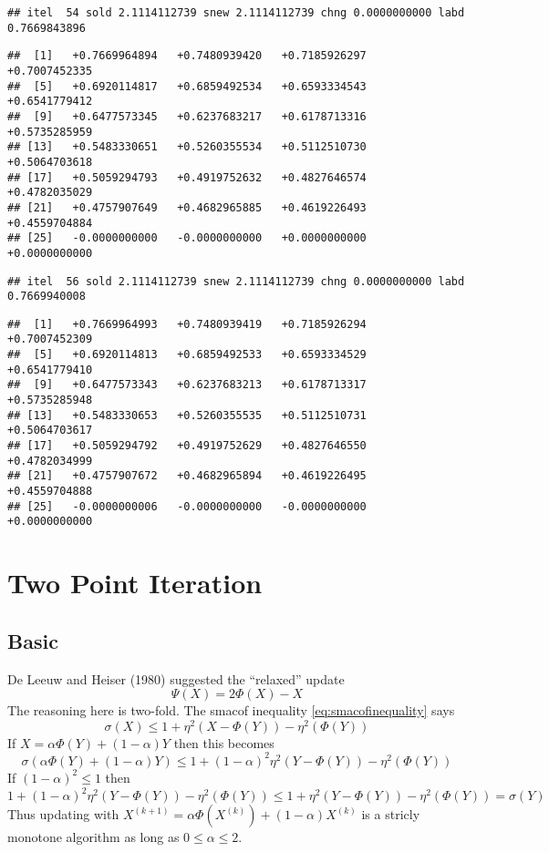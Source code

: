 \documentclass[
  12pt,
]{article}
\begin{document}
\begin{verbatim}
## itel  54 sold 2.1114112739 snew 2.1114112739 chng 0.0000000000 labd 0.7669843896
\end{verbatim}

\begin{verbatim}
##  [1]   +0.7669964894   +0.7480939420   +0.7185926297   +0.7007452335
##  [5]   +0.6920114817   +0.6859492534   +0.6593334543   +0.6541779412
##  [9]   +0.6477573345   +0.6237683217   +0.6178713316   +0.5735285959
## [13]   +0.5483330651   +0.5260355534   +0.5112510730   +0.5064703618
## [17]   +0.5059294793   +0.4919752632   +0.4827646574   +0.4782035029
## [21]   +0.4757907649   +0.4682965885   +0.4619226493   +0.4559704884
## [25]   -0.0000000000   -0.0000000000   +0.0000000000   +0.0000000000
\end{verbatim}

\begin{verbatim}
## itel  56 sold 2.1114112739 snew 2.1114112739 chng 0.0000000000 labd 0.7669940008
\end{verbatim}

\begin{verbatim}
##  [1]   +0.7669964993   +0.7480939419   +0.7185926294   +0.7007452309
##  [5]   +0.6920114813   +0.6859492533   +0.6593334529   +0.6541779410
##  [9]   +0.6477573343   +0.6237683213   +0.6178713317   +0.5735285948
## [13]   +0.5483330653   +0.5260355535   +0.5112510731   +0.5064703617
## [17]   +0.5059294792   +0.4919752629   +0.4827646550   +0.4782034999
## [21]   +0.4757907672   +0.4682965894   +0.4619226495   +0.4559704888
## [25]   -0.0000000006   -0.0000000000   -0.0000000000   +0.0000000000
\end{verbatim}

\section{Two Point Iteration}\label{two-point-iteration}

\subsection{Basic}\label{basic}

De Leeuw and Heiser (1980) suggested the ``relaxed'' update
\[
\Psi(X)=2\Phi(X)-X
\]
The reasoning here is two-fold. The smacof inequality \eqref{eq:smacofinequality} says
\[
\sigma(X)\leq 1+\eta^2(X-\Phi(Y))-\eta^2(\Phi(Y))
\]
If \(X=\alpha\Phi(Y)+(1-\alpha)Y\) then this becomes
\[
\sigma(\alpha\Phi(Y)+(1-\alpha)Y)\leq 1+(1-\alpha)^2\eta^2(Y-\Phi(Y))-\eta^2(\Phi(Y))
\]
If \((1-\alpha)^2\leq 1\) then
\[
1+(1-\alpha)^2\eta^2(Y-\Phi(Y))-\eta^2(\Phi(Y))\leq 1+\eta^2(Y-\Phi(Y))-\eta^2(\Phi(Y))=\sigma(Y)
\]
Thus updating with \(X^{(k+1)}=\alpha\Phi(X^{(k)})+(1-\alpha)X^{(k)}\) is a stricly
monotone algorithm as long as \(0\leq\alpha\leq 2\).
\end{document}
